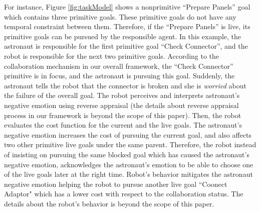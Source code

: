 \documentclass[conference]{IEEEtran}
\begin{document}
For instance, Figure \ref{fig:taskModel} shows a nonprimitive ``Prepare Panels''
goal which contains three primitive goals. These primitive goals do not have any
temporal constraint between them. Therefore, if the ``Prepare Panels'' is live,
its primitive goals can be pursued by the responsible agent. In this example,
the astronaut is responsible for the first primitive goal ``Check Connector'',
and the robot is responsible for the next two primitive goals. According to the
collaboration mechanism in our overall framework, the ``Check Connector''
primitive is in focus, and the astronaut is pursuing this goal. Suddenly, the
astronaut tells the robot that the connector is broken and she is
\textit{worried} about the failure of the overall goal. The robot perceives and
interprets astronaut's negative emotion using reverse appraisal (the details
about reverse appraisal process in our framework is beyond the scope of this
paper). Then, the robot evaluates the cost function for the current and the live
goals. The astronaut's negative emotion increases the cost of pursuing the
current goal, and also affects two other primitive live goals under the same
parent. Therefore, the robot instead of insisting on pursuing the same blocked
goal which has caused the astronaut's negative emotion, acknowledges the
astronaut's emotion to be able to choose one of the live goals later at the
right time. Robot's behavior mitigates the astronaut negative emotion helping
the robot to pursue another live goal ``Coonect Adaptor" which has a lower cost
with respect to the collaboration status. The details about the robot's behavior
is beyond the scope of this paper.
\end{document}
